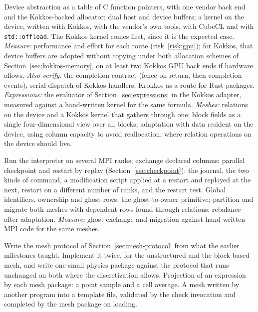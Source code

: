 \documentclass[11pt,a4paper]{article}
\newcommand{\code}[1]{\texttt{#1}}
\begin{document}
\begin{description}[style=nextline,leftmargin=2em]
  \item[M5. Device memory.]
        Device abstraction as a table of C function pointers, with one
        vendor back end and the Kokkos-backed allocator; dual host and device
        buffers; a kernel on the device, written with Kokkos, with the
        vendor's own tools, with CubeCL and with \code{std::offload}.  The
        Kokkos kernel comes first, since it is the expected case.
        \emph{Measure:} performance and effort for each route (risk~\ref{risk:gpu}); for
        Kokkos, that device buffers are adopted without copying under both
        allocation schemes of Section~\ref{sec:kokkos-memory}, on at least
        two Kokkos GPU back ends if hardware allows.
        \emph{Also verify:} the completion contract (fence on return, then
        completion events); serial dispatch of Kokkos handlers; Krokkos as a
        route for Rust packages.
        \emph{Expressions:} the evaluator of
        Section~\ref{sec:expressions} in the Kokkos adapter, measured
        against a hand-written kernel for the same formula.
        \emph{Meshes:} relations on the device and a Kokkos kernel that
        gathers through one; block fields as a single four-dimensional view
        over all blocks; adaptation with data resident on the device, using
        column capacity to avoid reallocation; where relation operations on
        the device should live.
  \item[M6. Distribution.]
        Run the interpreter on several MPI ranks; exchange declared columns;
        parallel checkpoint and restart by replay
        (Section~\ref{sec:checkpoint}): the journal, the two kinds of
        command, a modification script applied at a restart and replayed at
        the next, restart on a different number of ranks, and the restart
        test.  Global identifiers, ownership and
        ghost rows; the ghost-to-owner primitive; partition and migrate both
        meshes with dependent rows found through relations; rebalance after
        adaptation.
        \emph{Measure:} ghost exchange and migration against hand-written MPI
        code for the same meshes.
  \item[M7. Mesh protocol.]
        Write the mesh protocol of Section~\ref{sec:mesh-protocol} from what
        the earlier milestones taught.  Implement it twice, for the
        unstructured and the block-based mesh, and write one small physics
        package against the protocol that runs unchanged on both where the
        discretization allows.  Projection of an expression by each mesh
        package: a point sample and a cell average.  A mesh written by
        another program into a template file, validated by the check
        invocation and completed by the mesh package on loading.
\end{description}
\end{document}
